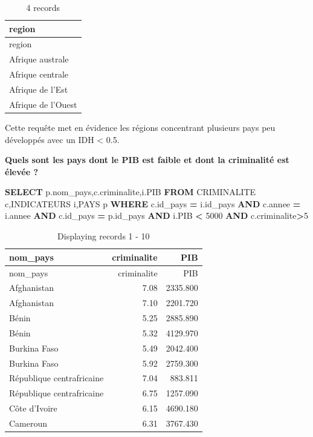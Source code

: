 \documentclass[mstat,12pt]{unswthesis}
\newenvironment{Shaded}{\begin{snugshade}}{\end{snugshade}}
\newcommand{\DecValTok}[1]{\textcolor[rgb]{0.00,0.00,0.81}{#1}}
\newcommand{\KeywordTok}[1]{\textcolor[rgb]{0.13,0.29,0.53}{\textbf{#1}}}
\newcommand{\NormalTok}[1]{#1}
\newcommand{\OperatorTok}[1]{\textcolor[rgb]{0.81,0.36,0.00}{\textbf{#1}}}
\begin{document}
\begin{longtable}[]{@{}l@{}}
\caption{4 records}\tabularnewline
\toprule\noalign{}
region \\
\midrule\noalign{}
\endfirsthead
\toprule\noalign{}
region \\
\midrule\noalign{}
\endhead
\bottomrule\noalign{}
\endlastfoot
Afrique australe \\
Afrique centrale \\
Afrique de l'Est \\
Afrique de l'Ouest \\
\end{longtable}

Cette requête met en évidence les régions concentrant plusieurs pays peu
développés avec un IDH \textless{} 0.5.

\textbf{Quels sont les pays dont le PIB est faible et dont la
criminalité est élevée ?}

\begin{Shaded}
\begin{Highlighting}[]
\KeywordTok{SELECT}\NormalTok{ p.nom\_pays,c.criminalite,i.PIB}
\KeywordTok{FROM}\NormalTok{ CRIMINALITE c,INDICATEURS i,PAYS p}
\KeywordTok{WHERE}\NormalTok{ c.id\_pays }\OperatorTok{=}\NormalTok{ i.id\_pays}
\KeywordTok{AND}\NormalTok{ c.annee }\OperatorTok{=}\NormalTok{ i.annee}
\KeywordTok{AND}\NormalTok{ c.id\_pays }\OperatorTok{=}\NormalTok{ p.id\_pays}
\KeywordTok{AND}\NormalTok{ i.PIB }\OperatorTok{\textless{}} \DecValTok{5000}
\KeywordTok{AND}\NormalTok{ c.criminalite}\OperatorTok{\textgreater{}}\DecValTok{5}
\end{Highlighting}
\end{Shaded}

\begin{longtable}[]{@{}lrr@{}}
\caption{Displaying records 1 - 10}\tabularnewline
\toprule\noalign{}
nom\_pays & criminalite & PIB \\
\midrule\noalign{}
\endfirsthead
\toprule\noalign{}
nom\_pays & criminalite & PIB \\
\midrule\noalign{}
\endhead
\bottomrule\noalign{}
\endlastfoot
Afghanistan & 7.08 & 2335.800 \\
Afghanistan & 7.10 & 2201.720 \\
Bénin & 5.25 & 2885.890 \\
Bénin & 5.32 & 4129.970 \\
Burkina Faso & 5.49 & 2042.400 \\
Burkina Faso & 5.92 & 2759.300 \\
République centrafricaine & 7.04 & 883.811 \\
République centrafricaine & 6.75 & 1257.090 \\
Côte d'Ivoire & 6.15 & 4690.180 \\
Cameroun & 6.31 & 3767.430 \\
\end{longtable}
\end{document}
